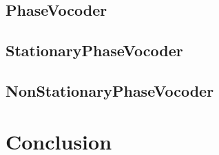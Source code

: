\documentclass[]{article}
\begin{document}
\subsection{PhaseVocoder}\label{sec:phasevocoder}
\subsection{StationaryPhaseVocoder}\label{sec:stationaryphasevocoder}
\subsection{NonStationaryPhaseVocoder}\label{sec:nonstationaryphasevocoder}

\newpage
\section*{Conclusion}

\newpage


\end{document}
